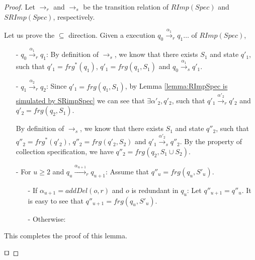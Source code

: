 \begin {proof}

Let $\rightarrow_r$ and $\rightarrow_s$ be the transition relation of $\mathit{RImp}(\mathit{Spec})$ and $\mathit{SRImp}(\mathit{Spec})$, respectively. 

Let us prove the $\subseteq$ direction. Given a execution $q_0 {\xrightarrow{\alpha_1}}_r q_1 \ldots$ of $\mathit{RImp}(\mathit{Spec})$, 

\begin{itemize}
\setlength{\itemsep}{0.5pt}
\item[-] $q_0 {\xrightarrow{\alpha_1}}_r q_1$: By definition of $\rightarrow_s$, we know that there exists $S_1$ and state $q'_1$, such that $q'_1 = \mathit{frg}^*(q_1)$, $q'_1 = \mathit{frg}(q_1,S_1)$ and $q_0 {\xrightarrow{\alpha_1}}_s q'_1$.

\item[-] $q_1 {\xrightarrow{\alpha_2}}_r q_2$: Since $q'_1 = \mathit{frg}(q_1,S_1)$, by Lemma \ref{lemma:RImpSpec is simulated by SRimpSpec} we can see that $\exists \alpha'_2, q'_2$, such that $q'_1 {\xrightarrow{\alpha'_2}}_r q'_2$ and $q'_2 = \mathit{frg}(q_2,S_1)$. 

By definition of $\rightarrow_s$, we know that there exists $S_1$ and state $q''_2$, such that $q''_2 = \mathit{frg}^*(q'_2)$, $q''_2 = \mathit{frg}(q'_2,S_2)$ and $q'_1 {\xrightarrow{\alpha'_2}}_s q''_2$. By the property of collection specification, we have $q''_2 = \mathit{frg}(q_2,S_1 \cup S_2)$.

\item[-] For $u \geq 2$ and $q_u {\xrightarrow{\alpha_{u+1}}}_r q_{u+1}$: Assume that $q''_u = \mathit{frg}(q_u,S'_u)$.

    \begin{itemize}
    \setlength{\itemsep}{0.5pt}
    \item[-] If $\alpha_{u+1} = \mathit{addDel}(o,r)$ and $o$ is redundant in $q_u$: Let $q''_{u+1} = q''_u$. It is easy to see that $q''_{u+1} = \mathit{frg}(q_u,S'_u)$. 
    
    \item[-] Otherwise:  
    \end{itemize}
 
\end{itemize}

This completes the proof of this lemma.

$\qed$
\end {proof}






